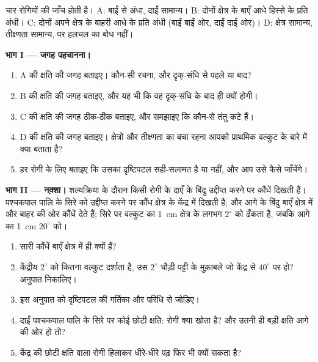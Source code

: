 \begin{problem}
\label{pb:g11:vision-and-brain:1}
चार रोगियों की जाँच होती है। A: बाईं  से अंधा, दाईं  सामान्य। B:
दोनों  क्षेत्र के बाएँ आधे हिस्से के प्रति अंधी। C: दोनों  अपने
क्षेत्र के बाहरी आधे के प्रति अंधी (बाईं  बाईं ओर, दाईं  दाईं ओर)।
D: क्षेत्र सामान्य, तीक्ष्णता सामान्य, पर हलचल का बोध नहीं।

\medskip
\noindent\textbf{भाग I --- जगह पहचानना।}
\begin{enumerate}
  \item A की क्षति की जगह बताइए। कौन-सी रचना, और दृक्-संधि से पहले या बाद?
  \item B की क्षति की जगह बताइए, और यह भी कि वह दृक्-संधि के बाद ही क्यों होगी।
  \item C की क्षति की जगह ठीक-ठीक बताइए, और समझाइए कि कौन-से तंतु कटे हैं।
  \item D की क्षति की जगह बताइए। क्षेत्रों और तीक्ष्णता का बचा रहना आपको
        प्राथमिक वल्कुट के बारे में क्या बताता है?
  \item हर रोगी के लिए बताइए कि उसका दृष्टिपटल सही-सलामत है या नहीं, और आप
        उसे कैसे जाँचेंगे।
\end{enumerate}

\medskip
\noindent\textbf{भाग II --- नक़्शा।}
शल्यक्रिया के दौरान किसी रोगी के दाएँ  के बिंदु उद्दीप्त करने
पर कौंधें दिखती हैं। पश्चकपाल पालि के सिरे को उद्दीप्त करने पर कौंध क्षेत्र
के केंद्र में दिखती है; और आगे के बिंदु बाएँ क्षेत्र में और बाहर की ओर
कौंधें देते हैं; सिरे पर वल्कुट का \qty{1}{cm} क्षेत्र के लगभग $2^\circ$
को ढँकता है, जबकि आगे का \qty{1}{cm} $20^\circ$ को।
\begin{enumerate}[resume]
  \item सारी कौंधें बाएँ क्षेत्र में ही क्यों हैं?
  \item केंद्रीय $2^\circ$ को कितना वल्कुट दर्शाता है, उस $2^\circ$
        चौड़ी पट्टी के मुक़ाबले जो केंद्र से $40^\circ$ पर हो? अनुपात
        निकालिए।
  \item इस अनुपात को दृष्टिपटल की गर्तिका और परिधि से जोड़िए।
  \item दाईं पश्चकपाल पालि के सिरे पर कोई छोटी क्षति: रोगी क्या खोता है?
        और उतनी ही बड़ी क्षति आगे की ओर हो तो?
  \item केंद्र की छोटी क्षति वाला रोगी  हिलाकर धीरे-धीरे पढ़ फिर भी
        क्यों सकता है?
\end{enumerate}


\end{problem}
